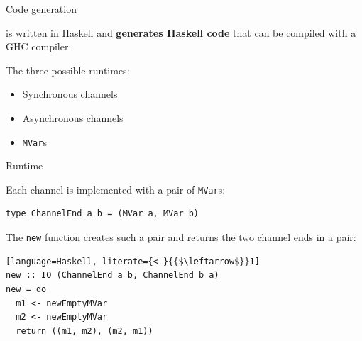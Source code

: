 \documentclass[10pt]{beamer}
\begin{document}
\begin{frame}[fragile]{Code generation}

\freest{} is written in Haskell and \textbf{generates Haskell code} that can be
compiled with a GHC compiler. \pause

\vskip 1cm
The three possible runtimes:
\begin{itemize}
   \item Synchronous channels\pause
   \item Asynchronous channels\pause
   \item \lstinline|MVar|s                  
\end{itemize}	



\end{frame}


\begin{frame}[fragile]{Runtime}

Each channel is implemented with a pair of \lstinline|MVar|s:
\begin{lstlisting}
type ChannelEnd a b = (MVar a, MVar b)
\end{lstlisting}

\pause
The \lstinline|new| function creates such a pair and returns the two
channel ends in a pair:

\begin{lstlisting}[language=Haskell, literate={<-}{{$\leftarrow$}}1]
new :: IO (ChannelEnd a b, ChannelEnd b a)
new = do
  m1 <- newEmptyMVar
  m2 <- newEmptyMVar
  return ((m1, m2), (m2, m1))
\end{lstlisting}
\end{frame}
\end{document}
